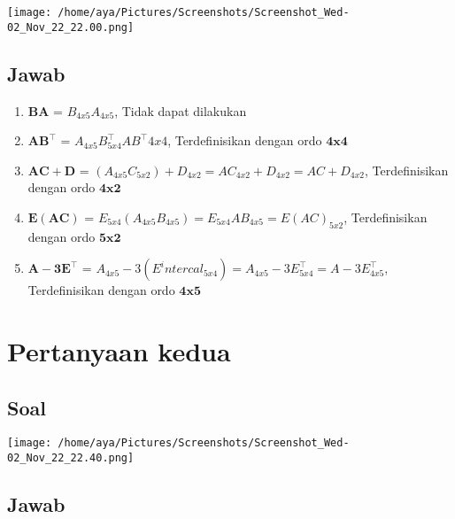 \documentclass[12pt, a4paper, onecolumn, oneside, final, bahasa]{report}
\let\origfigure\figure
\let\endorigfigure\endfigure
\renewenvironment{figure}[1][2] {
    \expandafter\origfigure\expandafter[H]
} {
    \endorigfigure
}
\providecommand{\tightlist}{%
  \setlength{\itemsep}{0pt}\setlength{\parskip}{0pt}}
\begin{document}
\begin{figure}
\centering
\texttt{[image: /home/aya/Pictures/Screenshots/Screenshot\_Wed-02\_Nov\_22\_22.00.png]}
\caption{pertama}
\end{figure}

\hypertarget{jawab}{%
\section{Jawab}\label{jawab}}

\begin{enumerate}
\def\labelenumi{\arabic{enumi}.}
\tightlist
\item
  \(\mathbf{BA}\) = \(B_{4x5} A_{4x5}\), Tidak dapat dilakukan
\item
  \(\mathbf{AB}^\intercal\) =
  \(A_{4x5} B^\intercal_{5x4} AB^\intercal{4x4}\), Terdefinisikan dengan
  ordo \(\mathbf{4x4}\)
\item
  \(\mathbf{AC+D}\) =
  \((A_{4x5}C_{5x2}) + D_{4x2} = AC_{4x2} + D_{4x2} = AC+D_{4x2}\),
  Terdefinisikan dengan ordo \(\mathbf{4x2}\)
\item
  \(\mathbf{E(AC)}\) =
  \(E_{5x4}(A_{4x5}B_{4x5}) = E_{5x4}AB_{4x5} = E(AC)_{5x2}\),
  Terdefinisikan dengan ordo \(\mathbf{5x2}\)
\item
  \(\mathbf{A-3E^\intercal}\) =
  \(A_{4x5} - 3(E^intercal_{5x4}) = A_{4x5} - 3E^\intercal_{5x4} = A-3E^\intercal_{4x5}\),
  Terdefinisikan dengan ordo \(\mathbf{4x5}\)
\end{enumerate}

\hypertarget{pertanyaan-kedua}{%
\chapter{Pertanyaan kedua}\label{pertanyaan-kedua}}

\hypertarget{soal-1}{%
\section{Soal}\label{soal-1}}

\begin{figure}
\centering
\texttt{[image: /home/aya/Pictures/Screenshots/Screenshot\_Wed-02\_Nov\_22\_22.40.png]}
\caption{kedua}
\end{figure}

\hypertarget{jawab-1}{%
\section{Jawab}\label{jawab-1}}
\end{document}
